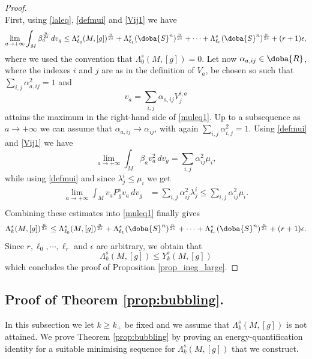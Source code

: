 \documentclass[10pt]{amsart}
\numberwithin{equation}{section}
\def\al{{\alpha}}
\def\La{{\Lambda}}
\def\la{{\lambda}}
\def\ep{{\varepsilon}}
\gdef\mR{\doba{R}}
\gdef\mS{\doba{S}}
\def \ep{\epsilon}
\theoremstyle{plain}
\theoremstyle{remark}
\begin{document}
\begin{proof}
\begin{equation}
\end{equation}
First, using \eqref{laleq}, \eqref{defmui} and \eqref{Vij1} we have 
$$\lim_{a \to +\infty}  \int_M \beta_a^{\frac{n}{2s}}\, dv_g 
 \leq   \La_{\ell_0}^s(M,[g])^{\frac{n}{2s}} + \La_{\ell_1}^s(\mS^n)^{\frac{n}{2s}} +  \cdots +\La_{\ell_r}^s(\mS^n)^{\frac{n}{2s}} + (r+1) \ep,$$
where we used the convention that $\Lambda_0^s(M,[g]) = 0$. Let now $\al_{a,ij} \in \mR$, where the indexes $i$ and $j$ are as in the definition of $V_a$, be chosen so such that $\sum_{i,j} \alpha_{a,ij}^2 = 1$ and 
$$ v_a = \sum_{i,j} \al_{a,ij} V_j^{i,a}$$
attains the maximum in the right-hand side of \eqref{muleq1}. Up to a subsequence as $a \to + \infty$ we can assume that $\alpha_{a,ij} \to \alpha_{ij}$, with again $\sum_{i,j} \alpha_{i,j}^2 = 1$. Using \eqref{defmui} and  \eqref{Vij1} we have 
$$\lim_{a \to +\infty} \int_M \beta_a v_a^2 \, dv_g = \sum_{i,j}  \al_{ij}^2 \mu_i  ,$$ 
while using \eqref{defmui} and since $\la_j^i \leq \mu_i$ we get  
$$\begin{aligned} 
  \lim_{a \to +\infty} \int_M v_a P_g^s v_a \, dv_g& =   \sum_{i,j}\al_{ij}^2 \la_j^i \le  \sum_{i,j}  \al_{ij}^2 \mu_i  .  \\
 \end{aligned}$$
 Combining these estimates into \eqref{muleq1} finally gives 
 $$\La_k^s(M,[g])^{\frac{n}{2s}} \leq  \La_{\ell_0}^s(M,[g])^{\frac{n}{2s}} + \La_{\ell_1}^s(\mS^n)^{\frac{n}{2s}} +  \cdots +\La_{\ell_r}^s(\mS^n)^{\frac{n}{2s}} + (r+1) \ep.$$
 Since $r,\ell_0,\cdots,\ell_r$ and $\ep$ are arbitrary, we obtain that 
 \begin{equation} \label{muleqX'}
\La_k^s(M,[g]) \leq Y_k^s(M,[g])
 \end{equation}
 which concludes the proof of Proposition \ref{prop_ineg_large}.
\end{proof}



\subsection{Proof of Theorem \ref{prop:bubbling}.}


In this subsection we let $k \ge k_+$ be fixed and we assume that $\La_k^s(M,[g])$ is not attained. We prove Theorem \ref{prop:bubbling} by proving an energy-quantification identity for a suitable minimising sequence for $\La_k^{s}(M,[g])$ that we construct.
\end{document}
